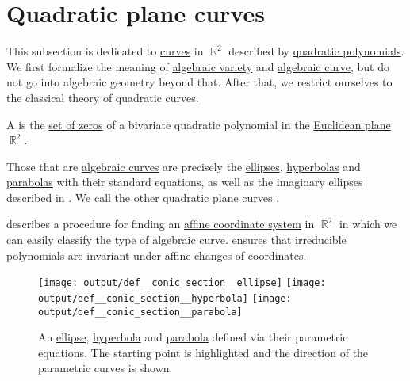 \section{Quadratic plane curves}\label{sec:quadratic_plane_curves}

This subsection is dedicated to \hyperref[def:parametric_curve]{curves} in \( \BbbR^2 \) described by \hyperref[def:polynomial_degree]{quadratic polynomials}. We first formalize the meaning of \hyperref[def:affine_algebraic_set/variety]{algebraic variety} and \hyperref[def:affine_algebraic_set/curve]{algebraic curve}, but do not go into algebraic geometry beyond that. After that, we restrict ourselves to the classical theory of quadratic curves.

\begin{definition}\label{def:quadratic_plane_curve}\mimprovised
  A  is the \hyperref[def:root_of_polynomial]{set of zeros} of a bivariate quadratic polynomial in the \hyperref[def:euclidean_plane]{Euclidean plane} \( \BbbR^2 \).

  Those that are \hyperref[def:affine_algebraic_set/curve]{algebraic curves} are precisely the \hyperref[def:ellipse]{ellipses}, \hyperref[def:hyperbola]{hyperbolas} and \hyperref[def:parabola]{parabolas} with their standard equations, as well as the imaginary ellipses described in . We call the other quadratic plane curves .

   describes a procedure for finding an \hyperref[def:affine_coordinate_system]{affine coordinate system} in \( \BbbR^2 \) in which we can easily classify the type of algebraic curve.  ensures that irreducible polynomials are invariant under affine changes of coordinates.

  \begin{figure}[!ht]
    \hfill
    \hfill
    \texttt{[image: output/def\_\_conic\_section\_\_ellipse]}
    \hfill
    \texttt{[image: output/def\_\_conic\_section\_\_hyperbola]}
    \hfill
    \texttt{[image: output/def\_\_conic\_section\_\_parabola]}
    \hfill
    \caption{An \hyperref[def:ellipse]{ellipse}, \hyperref[def:hyperbola]{hyperbola} and \hyperref[def:parabola]{parabola} defined via their parametric equations. The starting point is highlighted and the direction of the parametric curves is shown.}\label{fig:def:quadratic_plane_curve}
  \end{figure}
\end{definition}

